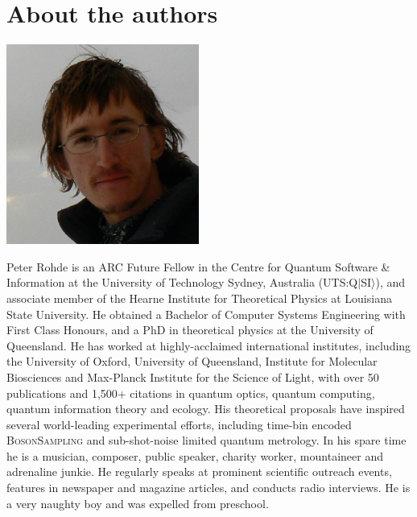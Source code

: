 %
%

\section*{About the authors}

%
%

\begin{center}
\includegraphics[clip=true, width=0.475\textwidth]{photo_peter_rohde}
\end{center}

Peter Rohde is an ARC Future Fellow in the Centre for Quantum Software \& Information at the University of Technology Sydney, Australia (UTS:Q$|$SI$\rangle$), and associate member of the Hearne Institute for Theoretical Physics at Louisiana State University. He obtained a Bachelor of Computer Systems Engineering with First Class Honours, and a PhD in theoretical physics at the University of Queensland. He has worked at highly-acclaimed international institutes, including the University of Oxford, University of Queensland, Institute for Molecular Biosciences and Max-Planck Institute for the Science of Light, with over 50 publications and 1,500+ citations in quantum optics, quantum computing, quantum information theory and ecology. His theoretical proposals have inspired several world-leading experimental efforts, including time-bin encoded \textsc{BosonSampling} and sub-shot-noise limited quantum metrology. In his spare time he is a musician, composer, public speaker, charity worker, mountaineer and adrenaline junkie. He regularly speaks at prominent scientific outreach events, features in newspaper and magazine articles, and conducts radio interviews. He is a very naughty boy and was expelled from preschool.

%
%

